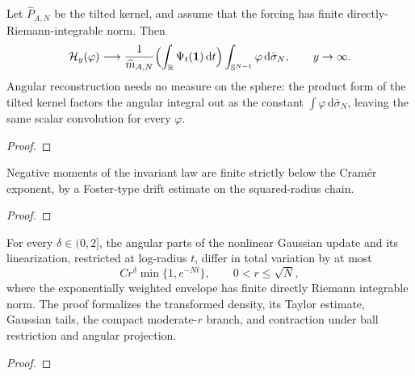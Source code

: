\begin{lemma}
  \label{lem:nd-gaussian-renewal}
  \leanok
  Let $\widehat P_{A,N}$ be the tilted kernel, and assume that the forcing has
  finite directly-Riemann-integrable norm. Then
  \[
    \mathcal H_y(\varphi)\longrightarrow
    \frac{1}{\widehat m_{A,N}}
    \Bigl(\int_{\mathbb R}\Psi_t(\mathbf 1)\,\mathrm dt\Bigr)
    \int_{\mathbb S^{N-1}}\varphi\,\mathrm d\bar\sigma_N ,
    \qquad y\to\infty .
  \]
  Angular reconstruction needs no measure on the sphere: the product form of the
  tilted kernel factors the angular integral out as the constant
  $\int\varphi\,\mathrm d\bar\sigma_N$, leaving the same scalar convolution for
  every $\varphi$.
\end{lemma}
\begin{proof}\leanok\end{proof}

\begin{lemma}
  \label{lem:nd-subcritical-exponential-moments}
  \leanok
  Negative moments of the invariant law are finite strictly below the Cram\'er
  exponent, by a Foster-type drift estimate on the squared-radius chain.
\end{lemma}
\begin{proof}\leanok\end{proof}

\begin{lemma}
  \label{lem:nd-gaussian-polar-perturbation}
  \leanok
  For every $\delta\in(0,2]$, the angular parts of the nonlinear Gaussian
  update and its linearization, restricted at log-radius $t$, differ in total
  variation by at most
  \[
    C r^\delta \min\{1,e^{-Nt}\},\qquad 0<r\le\sqrt N,
  \]
  where the exponentially weighted envelope has finite directly Riemann
  integrable norm.  The proof formalizes the transformed density, its Taylor
  estimate, Gaussian tails, the compact moderate-$r$ branch, and contraction
  under ball restriction and angular projection.
\end{lemma}
\begin{proof}\leanok\end{proof}


